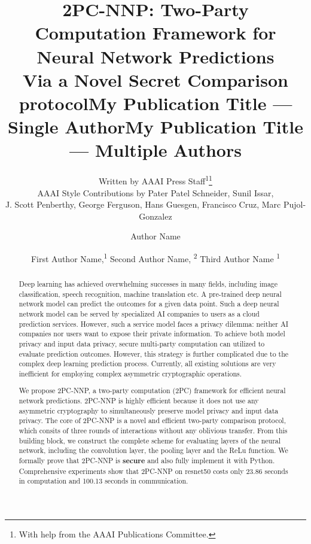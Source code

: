 \documentclass[letterpaper]{article} %
\title{2PC-NNP: Two-Party Computation Framework for Neural Network Predictions \\ Via a Novel Secret Comparison protocol}
\author{
    Written by AAAI Press Staff\textsuperscript{\rm 1}\thanks{With help from the AAAI Publications Committee.}\\
    AAAI Style Contributions by Pater Patel Schneider,
    Sunil Issar,\\
    J. Scott Penberthy,
    George Ferguson,
    Hans Guesgen,
    Francisco Cruz\equalcontrib,
    Marc Pujol-Gonzalez\equalcontrib
}
\title{My Publication Title --- Single Author}
\author {
    Author Name
}
\title{My Publication Title --- Multiple Authors}
\author {
    First Author Name,\textsuperscript{\rm 1}
    Second Author Name, \textsuperscript{\rm 2}
    Third Author Name \textsuperscript{\rm 1}
}
\begin{document}
\maketitle

\begin{abstract}

    Deep learning has achieved overwhelming successes in many fields, including image classification, speech recognition, machine translation etc.
    A pre-trained deep neural network model can predict the outcomes
    for a given data point. Such a deep neural network model can be served by
    specialized AI companies to users as a cloud prediction services.
    However, such a service model faces a privacy dilemma: neither AI companies nor
    users want to expose their private information.
    To achieve both model privacy and input data privacy,
    secure multi-party computation can utilized to evaluate prediction outcomes. However,
    this strategy is further complicated due to the complex deep learning prediction process.
    Currently, all existing solutions are very inefficient for employing complex asymmetric cryptographic operations.

    We propose 2PC-NNP, a two-party computation (2PC) framework for efficient neural network predictions.
    2PC-NNP is highly efficient because it does not use any asymmetric cryptography to simultaneously preserve model privacy and input data privacy.
    The core of 2PC-NNP is a novel and efficient two-party comparison protocol,
    which consits of three rounds of interactions without any oblivious transfer.
    From this building block, we construct the complete scheme for evaluating layers of the neural network, including the convolution layer, the pooling layer and the ReLu function.
		We formally prove that 2PC-NNP is {\bf secure} and also fully implement it with Python.
    Comprehensive experiments show that 2PC-NNP on resnet50
    costs only 23.86 seconds in computation and 100.13 seconds in communication.



\end{abstract}
\end{document}
